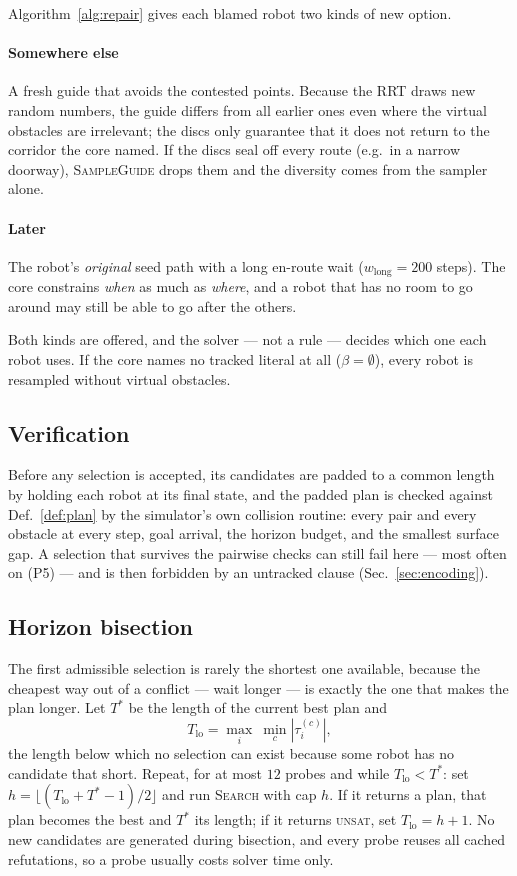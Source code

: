 \documentclass[conference]{IEEEtran}
\theoremstyle{plain}
\theoremstyle{definition}
\begin{document}
Algorithm~\ref{alg:repair} gives each blamed robot two kinds of new option.

\paragraph*{Somewhere else}
A fresh guide that avoids the contested points. Because the RRT draws new random numbers, the
guide differs from all earlier ones even where the virtual obstacles are irrelevant; the discs
only guarantee that it does not return to the corridor the core named. If the discs seal off
every route (e.g.\ in a narrow doorway), \textsc{SampleGuide} drops them and the diversity
comes from the sampler alone.

\paragraph*{Later}
The robot's \emph{original} seed path with a long en-route wait ($w_{\text{long}} = 200$
steps). The core constrains \emph{when} as much as \emph{where}, and a robot that has no room
to go around may still be able to go after the others.

Both kinds are offered, and the solver --- not a rule --- decides which one each robot uses.
If the core names no tracked literal at all ($\beta = \emptyset$), every robot is resampled
without virtual obstacles.

\subsection{Verification}
\label{sec:verify}

Before any selection is accepted, its candidates are padded to a common length by holding each
robot at its final state, and the padded plan is checked against Def.~\ref{def:plan} by the
simulator's own collision routine: every pair and every obstacle at every step, goal arrival,
the horizon budget, and the smallest surface gap. A selection that survives the pairwise
checks can still fail here --- most often on (P5) --- and is then forbidden by an untracked
clause (Sec.~\ref{sec:encoding}).

\subsection{Horizon bisection}
\label{sec:bisect}

The first admissible selection is rarely the shortest one available, because the cheapest
way out of a conflict --- wait longer --- is exactly the one that makes the plan longer. Let
$T^\ast$ be the length of the current best plan and
\[
  T_{\text{lo}} = \max_i \ \min_{c} |\tau_i^{(c)}|,
\]
the length below which no selection can exist because some robot has no candidate that short.
Repeat, for at most $12$ probes and while $T_{\text{lo}} < T^\ast$: set
$h = \lfloor (T_{\text{lo}} + T^\ast - 1)/2 \rfloor$ and run \textsc{Search} with cap $h$. If
it returns a plan, that plan becomes the best and $T^\ast$ its length; if it returns
\textsc{unsat}, set $T_{\text{lo}} = h + 1$. No new candidates are generated during
bisection, and every probe reuses all cached refutations, so a probe usually costs solver
time only.
\end{document}
